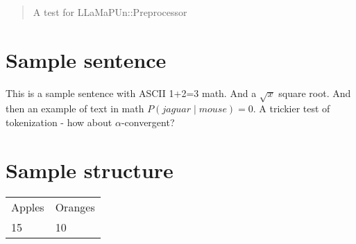 \documentclass{article}
\begin{document}
\begin{abstract}A test for LLaMaPUn::Preprocessor\end{abstract}
\section{Sample sentence}
This is a sample sentence with ASCII 1+2=3 math. And a $\sqrt{x}$ square root. And then an example of text in math $P(jaguar\mid mouse)=0$. A trickier test of tokenization - how about $\alpha$-convergent?
\section{Sample structure}
\begin{tabular}{ll}
Apples & Oranges \\
15 & 10 \\
\end{tabular}
\end{document}
